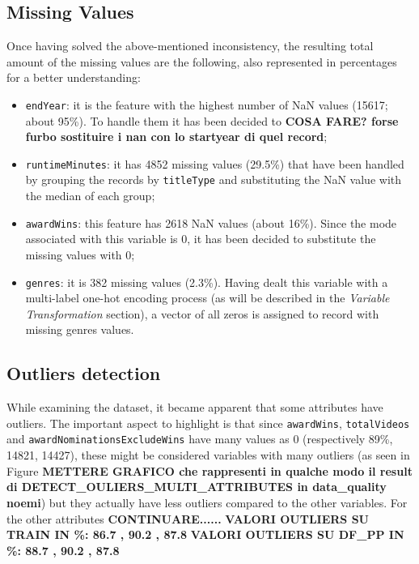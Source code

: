 \subsection{Missing Values}
Once having solved the above-mentioned inconsistency, the resulting total amount of the missing values are the following, also represented in percentages for a better understanding:
\begin{itemize}
    \item \texttt{endYear}: it is the feature with the highest number of NaN values (15617; about 95\%). To handle them it has been decided to \textbf{COSA FARE? forse furbo sostituire i nan con lo startyear di quel record};
    
    \item \texttt{runtimeMinutes}: it has 4852 missing values (29.5\%) that have been handled by grouping the records by \texttt{titleType} and substituting the NaN value with the median of each group;
    
    \item \texttt{awardWins}: this feature has 2618 NaN values (about 16\%). Since the mode associated with this variable is 0, it has been decided to substitute the missing values with 0;

    \item \texttt{genres}: it is 382 missing values (2.3\%). Having dealt this variable with a multi-label one-hot encoding process (as will be described in the \textit{Variable Transformation} section), a vector of all zeros is assigned to record with missing genres values.
\end{itemize}



\subsection{Outliers detection}
While examining the dataset, it became apparent that some attributes have outliers. 
The important aspect to highlight is that since \texttt{awardWins}, \texttt{totalVideos} and \texttt{awardNominationsExcludeWins} have many values as 0 (respectively 89\%, 14821, 14427), 
these might be considered variables with many outliers (as seen in Figure \textbf{METTERE GRAFICO che rappresenti in qualche modo il result di DETECT\_OULIERS\_MULTI\_ATTRIBUTES in data\_quality noemi}) but they actually have less outliers compared to the other variables.
For the other attributes \textbf{CONTINUARE......}
\textbf{VALORI OUTLIERS SU TRAIN IN \%: 86.7 , 90.2 , 87.8}
\textbf{VALORI OUTLIERS SU DF\_PP IN \%: 88.7 , 90.2 , 87.8}

